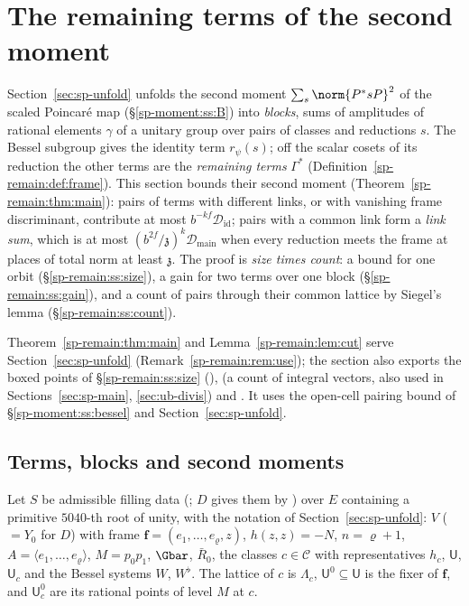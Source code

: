 \section{The remaining terms of the second moment}\label{sec:sp-remain}

Section~\ref{sec:sp-unfold} unfolds the second moment $\sum_s\norm{P^*sP}^2$ of the scaled
Poincaré map (\S\ref{sp-moment:ss:B}) into \emph{blocks}, sums of amplitudes of rational elements
$\gamma$ of a unitary group over pairs of classes and reductions $s$. The Bessel subgroup gives the
identity term $r_\psi(s)$; off the scalar cosets of its reduction the other terms are the
\emph{remaining terms} $\Gamma^*$ (Definition~\ref{sp-remain:def:frame}). This section bounds their
second moment (Theorem~\ref{sp-remain:thm:main}): pairs of terms with different links, or with
vanishing frame discriminant, contribute at most $b^{-kf}\mathcal D_{\mathrm{id}}$; pairs with a
common link form a \emph{link sum}, which is at most $(b^{2f}/\mathfrak z)^k\mathcal D_{\mathrm{main}}$ when
every reduction meets the frame at places of total norm at least $\mathfrak z$. The proof is \emph{size times count}:
a bound for one orbit (\S\ref{sp-remain:ss:size}), a gain for two terms over one block
(\S\ref{sp-remain:ss:gain}), and a count of pairs through their common lattice by Siegel's lemma
(\S\ref{sp-remain:ss:count}).

Theorem~\ref{sp-remain:thm:main} and Lemma~\ref{sp-remain:lem:cut} serve Section~\ref{sec:sp-unfold}
(Remark~\ref{sp-remain:rem:use}); the section also exports the boxed points of \S\ref{sp-remain:ss:size}
(),  (a count
of integral vectors, also used in Sections~\ref{sec:sp-main}, \ref{sec:ub-divis}) and
. It uses the open-cell pairing bound of \S\ref{sp-moment:ss:bessel}
and Section~\ref{sec:sp-unfold}.

\subsection{Terms, blocks and second moments}\label{sp-remain:ss:setup}

Let $S$ be admissible filling data (; $D$ gives them by ) over
$E$ containing a primitive $5040$-th root of unity, with the notation of Section~\ref{sec:sp-unfold}:
$V$ ($=Y_0$ for $D$) with frame $\mathbf f=(e_1,\dots,e_\varrho,z)$, $h(z,z)=-N$, $n=\varrho+1$,
$A=\langle e_1,\dots,e_\varrho\rangle$, $M=p_0p_1$, $\Gbar$, $\bar R_0$, the classes $c\in\mathcal C$ with
representatives $h_c$, $\mathsf U$, $\mathsf U_c$ and the Bessel systems $W$, $W^\flat$. The lattice of
$c$ is $\Lambda_c$, $\mathsf U^0\subseteq\mathsf U$ is the fixer of $\mathbf f$, and $\mathsf U^0_c$ are its rational
points of level $M$ at $c$.


